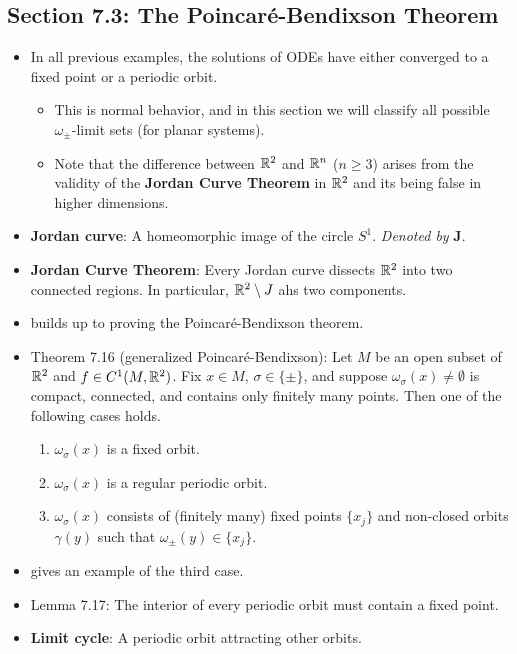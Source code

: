 \documentclass[../notes.tex]{subfiles}
\begin{document}
\subsection*{Section 7.3: The Poincar\'{e}-Bendixson Theorem}
\begin{itemize}
    \item In all previous examples, the solutions of ODEs have either converged to a fixed point or a periodic orbit.
    \begin{itemize}
        \item This is normal behavior, and in this section we will classify all possible $\omega_\pm$-limit sets (for planar systems).
        \item Note that the difference between $\mathbb{R}^2$ and $\mathbb{R}^n$ ($n\geq 3$) arises from the validity of the \textbf{Jordan Curve Theorem} in $\mathbb{R}^2$ and its being false in higher dimensions.
    \end{itemize}
    \item \textbf{Jordan curve}: A homeomorphic image of the circle $S^1$. \emph{Denoted by} $\bm{J}$.
    \item \textbf{Jordan Curve Theorem}: Every Jordan curve dissects $\mathbb{R}^2$ into two connected regions. In particular, $\mathbb{R}^2\setminus J$ ahs two components.
    \item \textcite{bib:Teschl} builds up to proving the Poincar\'{e}-Bendixson theorem.
    \item Theorem 7.16 (generalized Poincar\'{e}-Bendixson): Let $M$ be an open subset of $\mathbb{R}^2$ and $f\in C^1(M,\mathbb{R}^2)$. Fix $x\in M$, $\sigma\in\{\pm\}$, and suppose $\omega_\sigma(x)\neq\emptyset$ is compact, connected, and contains only finitely many points. Then one of the following cases holds.
    \begin{enumerate}[label={(\roman*)}]
        \item $\omega_\sigma(x)$ is a fixed orbit.
        \item $\omega_\sigma(x)$ is a regular periodic orbit.
        \item $\omega_\sigma(x)$ consists of (finitely many) fixed points $\{x_j\}$ and non-closed orbits $\gamma(y)$ such that $\omega_\pm(y)\in\{x_j\}$.
    \end{enumerate}
    \item \textcite{bib:Teschl} gives an example of the third case.
    \item Lemma 7.17: The interior of every periodic orbit must contain a fixed point.
    \item \textbf{Limit cycle}: A periodic orbit attracting other orbits.

\end{itemize}
\end{document}
